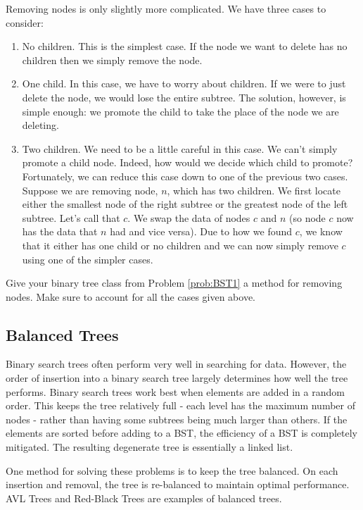 Removing nodes is only slightly more complicated.
We have three cases to consider:
\begin{enumerate} %
\item No children.  This is the simplest case.  If the node we want to delete has no children then we simply remove the node.
\item One child.  In this case, we have to worry about children.
If we were to just delete the node, we would lose the entire subtree.
The solution, however, is simple enough:
we promote the child to take the place of the node we are deleting.
\item Two children.  We need to be a little careful in this case.
We can't simply promote a child node.  Indeed, how would we decide which child to promote?
Fortunately, we can reduce this case down to one of the previous two cases.
Suppose we are removing node, $n$, which has two children.
We first locate either the smallest node of the right subtree or the greatest node of the left subtree.
Let's call that $c$.
We swap the data of nodes $c$ and $n$ (so node $c$ now has the data that $n$ had and vice versa).
Due to how we found $c$, we know that it either has one child or no children and we can now simply remove $c$ using one of the simpler cases.
\end{enumerate}

\begin{problem}
Give your binary tree class from Problem \ref{prob:BST1} a method for removing nodes.
Make sure  to account for all the cases given above.
\label{prob:BST2}
\end{problem}

\subsection*{Balanced Trees}
Binary search trees often perform very well in searching for data.
However, the order of insertion into a binary search tree largely determines how well the tree performs.
Binary search trees work best when elements are added in a random order.
This keeps the tree relatively full - each level has the maximum number of nodes -  rather than having some subtrees being much larger than others.
If the elements are sorted before adding to a BST, the efficiency of a BST is completely mitigated.
The resulting degenerate tree is essentially a linked list.

One method for solving these problems is to keep the tree balanced.
On each insertion and removal, the tree is re-balanced to maintain optimal performance.
AVL Trees and Red-Black Trees are examples of balanced trees.

